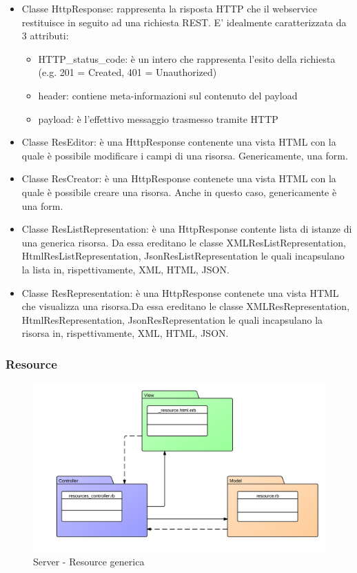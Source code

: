 \begin{itemize}
\item Classe HttpResponse: rappresenta la risposta HTTP che il webservice restituisce in seguito ad una richiesta REST. E' idealmente caratterizzata da 3 attributi:
\begin{itemize}
\item HTTP\_status\_code: è un intero che rappresenta l'esito della richiesta (e.g. 201 = Created, 401 = Unauthorized)
\item header: contiene meta-informazioni sul contenuto del payload
\item payload: è l'effettivo messaggio trasmesso tramite HTTP 
\end{itemize}
\item Classe ResEditor: è una HttpResponse contenente una vista HTML con la quale è possibile modificare i campi di una risorsa. Genericamente, una form.
\item Classe ResCreator: è una HttpResponse contenete una vista HTML con la quale è possibile creare una risorsa. Anche in questo caso, genericamente è una form.
\item Classe ResListRepresentation:  è una HttpResponse contente lista di istanze di una generica risorsa. Da essa ereditano le classe XMLResListRepresentation, HtmlResListRepresentation, JsonResListRepresentation le quali incapsulano la lista in, rispettivamente, XML, HTML, JSON.
\item Classe ResRepresentation: è una HttpResponse contenete una vista HTML che visualizza una risorsa.Da essa ereditano le classe XMLResRepresentation, HtmlResRepresentation, JsonResRepresentation le quali incapsulano la risorsa in, rispettivamente, XML, HTML, JSON.
\end{itemize}

\subsubsection{Resource}
\label{resource}

\begin{figure}[H]
\centering
\includegraphics[scale=0.70]{images/Server/MvcResource.png}
\caption{Server - Resource generica}
\end{figure}

